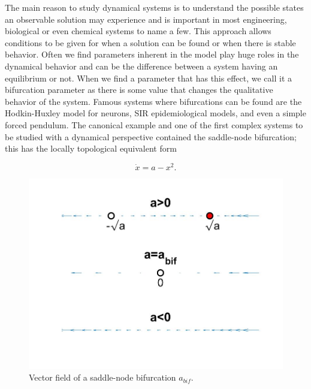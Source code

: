 The main reason to study dynamical systems is to understand the possible states an observable solution may experience and is important in most engineering, biological or even chemical systems to name a few. This approach allows conditions to be given for when a solution can be found or when there is stable behavior. Often we find parameters inherent in the model play huge roles in the dynamical behavior and can be the difference between a system having an equilibrium or not. When we find a parameter that has this effect, we call it a bifurcation parameter as there is some value that changes the qualitative behavior of the system. Famous systems where bifurcations can be found are the Hodkin-Huxley model for neurons, SIR epidemiological models, and even a simple forced pendulum. The canonical example and one of the first complex systems to be studied with a dynamical perspective contained the saddle-node bifurcation; this has the locally topological equivalent form

\begin{equation}\label{eq:intro_saddlenode}
\dot{x}=a-x^2.
\end{equation}

\begin{figure}[H]
\centering
\includegraphics[scale =.3]{intro/saddlenode.jpg}
\caption{Vector field of a saddle-node bifurcation $a_{bif}$.}
\label{fig:intro_saddlenode}
\end{figure}

